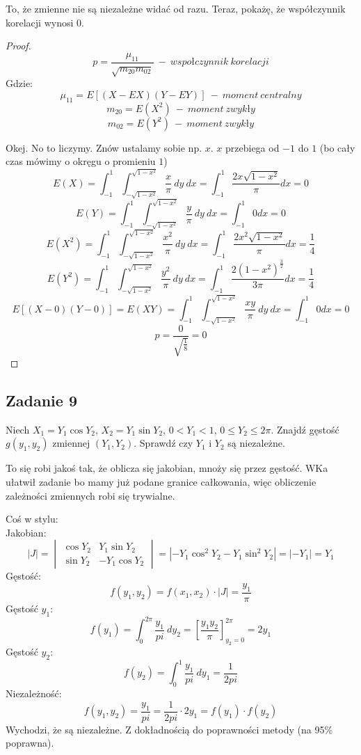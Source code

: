 \documentclass[a4paper]{article}
\begin{document}
To, że zmienne nie są niezależne widać od razu. Teraz, pokażę, że współczynnik korelacji wynosi 0.
\begin{proof}
$$p=\frac{\mu_{11}}{\sqrt{m_{20}m_{02}}} \ -\ wspołczynnik\ korelacji $$
Gdzie:
$$\mu_{11} = E[(X-EX)(Y-EY)]\ -\ moment\ centralny$$ 
$$m_{20}=E(X^2)\ -\ moment\ zwykły$$
$$m_{02}=E(Y^2)\ -\ moment\ zwykły$$

Okej. No to liczymy. Znów ustalamy sobie np. $x$. $x$ przebiega od $-1$ do $1$ (bo cały czas mówimy o okręgu o promieniu $1$)\\
$$E(X) = \int_{-1}^1 \int_{-\sqrt{1-x^2}}^{\sqrt{1-x^2}} \frac{x}{\pi}\ dy\ dx = \int_{-1}^1 \frac{2x \sqrt{1-x^2}}{\pi} dx = 0$$ 
$$E(Y) = \int_{-1}^1 \int_{-\sqrt{1-x^2}}^{\sqrt{1-x^2}} \frac{y}{\pi}\ dy\ dx = \int_{-1}^1 0 dx = 0$$
$$E(X^2) = \int_{-1}^1 \int_{-\sqrt{1-x^2}}^{\sqrt{1-x^2}} \frac{x^2}{\pi}\ dy\ dx = \int_{-1}^1 \frac{2x^2 \sqrt{1-x^2}}{\pi} dx = \frac{1}{4}$$ 
$$E(Y^2) = \int_{-1}^1 \int_{-\sqrt{1-x^2}}^{\sqrt{1-x^2}} \frac{y^2}{\pi}\ dy\ dx = \int_{-1}^1 \frac{2(1-x^2)^{\frac{3}{2}}}{3\pi} dx = \frac{1}{4}$$
$$E[(X-0)(Y-0)] = E(XY) = \int_{-1}^1 \int_{-\sqrt{1-x^2}}^{\sqrt{1-x^2}} \frac{xy}{\pi}\ dy\ dx = \int_{-1}^1 0 dx = 0$$
$$p=\frac{0}{\sqrt{\frac{1}{8}}}=0 $$

\end{proof}

\subsection*{Zadanie 9}
Niech $X_1=Y_1\cos{Y_2}$, $X_2=Y_1\sin{Y_2}$, $0<Y_1<1$, $0\leq Y_2 \leq 2\pi$. Znajdź gęstość $g(y_1,y_2)$ zmiennej $(Y_1,Y_2)$. Sprawdź czy $Y_1$ i $Y_2$ są niezależne.

To się robi jakoś tak, że oblicza się jakobian, mnoży się przez gęstość. WKa ułatwił zadanie bo mamy już podane granice całkowania, więc obliczenie zależności zmiennych robi się trywialne.

Coś w stylu:\\
Jakobian:
$$|J|=\begin{vmatrix}
\cos{Y_2} & Y_1\sin{Y_2}\\
\sin{Y_2} & -Y_1\cos{Y_2}
\end{vmatrix} = | -Y_1\cos^2{Y_2} - Y_1\sin^2{Y_2} | = |-Y_1| = Y_1$$
Gęstość:
$$f(y_1,y_2)=f(x_1,x_2)\cdot |J| = \frac{y_1}{\pi} $$
Gęstość $y_1$:
$$f(y_1)=\int_0^{2\pi} \frac{y_1}{pi}\ dy_2 = \left[ \frac{y_1 y_2}{\pi} \right]_{y_2=0}^{2\pi} = 2y_1 $$
Gęstość $y_2$:
$$f(y_2)=\int_0^1 \frac{y_1}{pi}\ dy_1 = \frac{1}{2pi} $$
Niezależność:
$$f(y_1,y_2)= \frac{y_1}{pi} = \frac{1}{2pi} \cdot 2y_1 = f(y_1) \cdot f(y_2)$$
Wychodzi, że są niezależne. Z dokładnością do poprawności metody (na 95\% poprawna).
\end{document}
